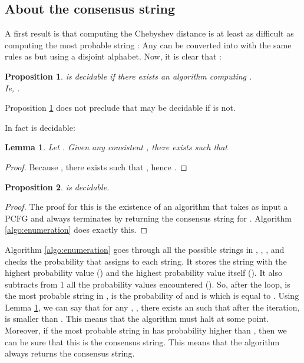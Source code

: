 \documentclass[submission]{eptcs} \usepackage{breakurl}             \usepackage[english]{babel}
\newtheorem{proposition}{Proposition}
\newtheorem{lemma}{Lemma}
\begin{document}
\subsection{About the consensus string}
A first result is that computing the Chebyshev distance is at least as difficult as computing the most probable string :
Any   can be converted into  with the same rules as  but using a disjoint alphabet. Now, it is clear that :
\begin{proposition}\label{linking_CS_Linf}
 is decidable if there exists an algorithm computing . \\
Ie, .
\end{proposition}
Proposition \ref{linking_CS_Linf} does not preclude that  may be decidable if  is not.\

In fact  is decidable:
\begin{lemma}\label{yes we can}
Let . Given any consistent  , there exists  such that 
\end{lemma}

\begin{proof}
Because , 
there exists  such that 
,
hence .
\end{proof}

\begin{proposition}\label{CS_is_decidable}
 is decidable.
\end{proposition}
\begin{proof}
The proof for this is the existence of an algorithm that takes as input a PCFG  and always terminates by returning the consensus string for . Algorithm \ref{algo:enumeration} does exactly this.

\end{proof}

Algorithm \ref{algo:enumeration} goes through all the possible strings in , , , and checks the probability that  assigns to each string. It stores the string with the highest probability value () and the highest probability value itself (). It also subtracts from 1 all the probability values encountered (). So, after the  loop,  is the most probable string in ,  is the probability of  and  is  which is equal to . Using Lemma \ref{yes we can}, we can say that for any , , there exists an  such that after the  iteration,  is smaller than . This means that the algorithm must halt at some point. Moreover, if the most probable string in  has probability higher than , then we can be sure that this is the consensus string. This means that the algorithm always returns the consensus string.  
\end{document}
